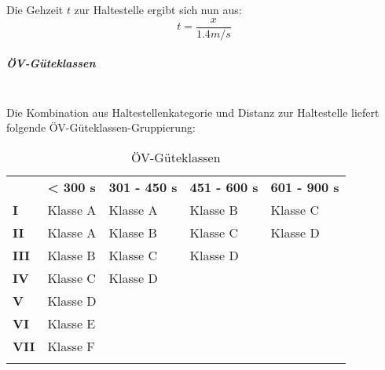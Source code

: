 Die Gehzeit $t$ zur Haltestelle ergibt sich nun aus:
\[ t = \frac{x}{1.4 m/s} \]


\subparagraph{ÖV-Güteklassen}~\\
\label{Berechnungsmethodik OeVGK18:ÖV-Güteklassen}
Die Kombination aus Haltestellenkategorie und Distanz zur Haltestelle liefert folgende \acs{ÖV}-Güteklassen-Gruppierung:

\begin{longtable}[c]{l p{3.3cm} p{3.3cm} p{3.3cm} p{3.3cm}}
    \midrule
    \textbf{}
                            & \textbf{< 300 s}
                            & \textbf{301 - 450 s}
                            & \textbf{451 - 600 s}
                            & \textbf{601 - 900 s}\\
    \textbf{I}
                            & Klasse A
                            & Klasse A
                            & Klasse B
                            & Klasse C\\
    \textbf{II}
                            & Klasse A
                            & Klasse B
                            & Klasse C
                            & Klasse D\\
    \textbf{III}
                            & Klasse B
                            & Klasse C
                            & Klasse D
                            &\\
    \textbf{IV}
                            & Klasse C
                            & Klasse D
                            &
                            &\\
    \textbf{V}
                            & Klasse D
                            &
                            &
                            &\\
    \textbf{VI}
                            & Klasse E
                            &
                            &
                            &\\
    \textbf{VII}
                            & Klasse F
                            &
                            &
                            &\\                                
    \bottomrule
\caption{ÖV-Güteklassen}
\label{table:ÖV-Güteklassen}
\end{longtable}
